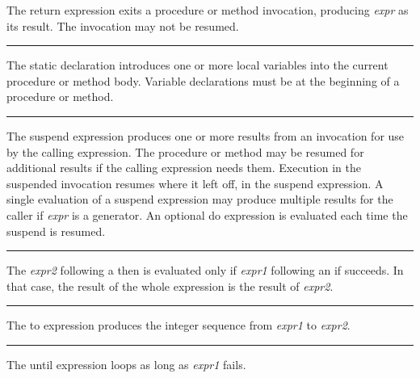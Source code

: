 \noindent
{}The \textsf{return} expression exits a procedure or method
invocation, producing \textit{expr} as its result. The invocation may
not be resumed.

\bigskip\hrule\vspace{0.1cm}

\noindent
{}The \textsf{static} declaration introduces one or more
local variables into the current procedure or method body. Variable
declarations must be at the beginning of a procedure or method.

\bigskip\hrule\vspace{0.1cm}

\noindent
{}The \textsf{suspend} expression produces one or more
results from an invocation for use by the calling expression. The
procedure or method may be resumed for additional results if the
calling expression needs them. Execution in the suspended invocation
resumes where it left off, in the \textsf{suspend} expression. A single
evaluation of a \textsf{suspend} expression may produce multiple
results for the caller if \textit{expr} is a
generator. An optional \textsf{do} expression is
evaluated each time the \textsf{suspend} is resumed.

\bigskip\hrule\vspace{0.1cm}

\noindent
{}The \textit{expr2} following a \textsf{then} is evaluated
only if \textit{expr1} following an \textsf{if} succeeds. In that case,
the result of the whole expression is the result of \textit{expr2}.

\bigskip\hrule\vspace{0.1cm}

\noindent
{}The \textsf{to} expression produces the integer
sequence from \textit{expr1} to \textit{expr2}.

\bigskip\hrule\vspace{0.1cm}

\noindent
{}The \textsf{until} expression loops as long
as \textit{expr1} fails.

